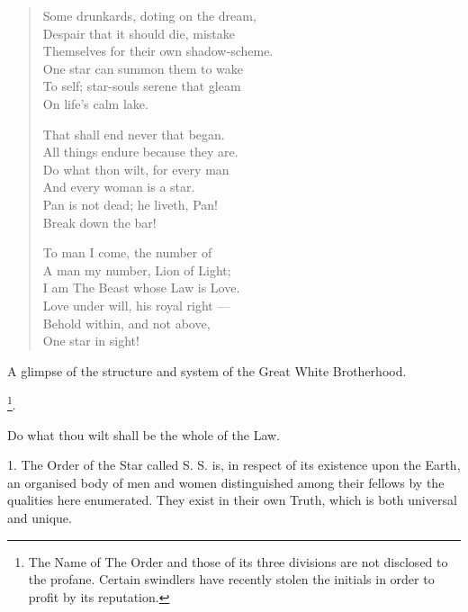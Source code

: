 \begin{verse}
  Some drunkards, doting on the dream, \\
  \hspace{1em}Despair that it should die, mistake \\
  Themselves for their own shadow-scheme. \\
  \hspace{1em}One star can summon them to wake \\
  To self; star-souls serene that gleam \\
  \hspace{1em}On life's calm lake.

  That shall end never that began. \\
  \hspace{1em}All things endure because they are. \\
  Do what thon wilt, for every man \\
  \hspace{1em}And every woman is a star. \\
  Pan is not dead; he liveth, Pan! \\
  \hspace{1em}Break down the bar!

  To man I come, the number of \\
  \hspace{1em}A man my number, Lion of Light; \\
  I am The Beast whose Law is Love. \\
  \hspace{1em}Love under will, his royal right --- \\
  Behold within, and not above, \\
  \hspace{1em}One star in sight!
\end{verse}


A glimpse of the structure and system of the Great White Brotherhood.

\begin{center}
  \Argentium{}\footnote{The Name of The Order and those of its three divisions are not disclosed to the profane. Certain swindlers have recently stolen the initials \Argentium{} in order to profit by its reputation.}.
\end{center}

Do what thou wilt shall be the whole of the Law.

1. The Order of the Star called S. S. is, in respect of its existence upon the Earth, an organised body of men and women distinguished among their fellows by the qualities here enumerated. They exist in their own Truth, which is both universal and unique.


